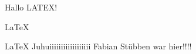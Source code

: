 \documentclass{article}
\begin{document}
Hallo LATEX!  
   
\LaTeX 

\huge
\LaTeX 
Juhuiiiiiiiiiiiiiiiiii  Fabian Stübben war hier!!!!
\end{document}
